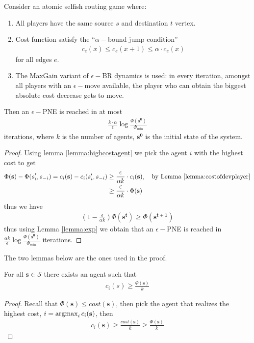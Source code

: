 \begin{thm}
Consider an atomic selfish routing game where:
\begin{enumerate}[1.]
\item All players have the same source $s$ and destination $t$ vertex.
\item Cost function satisfy the ``$\alpha-$bound jump condition''
\begin{align*}
c_e(x)\leq c_e(x+1)\leq\alpha\cdot c_e(x)
\end{align*}
for all edges $e$.
\item The MaxGain variant of $\epsilon-$BR dynamics is used: in every iteration, amongst all players with an $\epsilon-$move available, the player who can obtain the biggest absolute cost decrease gets to move.
\end{enumerate}
 Then an $\epsilon-$PNE is reached in at most
 \begin{align*}
 \frac{k \cdot \alpha}{\epsilon}\log\frac{\Phi(\mathbf{s^0})}{\Phi_{min}}
 \end{align*}
 iterations, where $k$ is the number of agents, $\mathbf{s^0}$ is the initial state of the system.
 \begin{proof}
 Using lemma \ref{lemma:highcostagent} we pick the agent $i$ with the highest cost to get
 \begin{align*}
 \Phi(\mathbf{s})-\Phi(s'_i,s_{-i})= c_i(\mathbf{s})-c_i(s'_i,s_{-i}) &\geq \frac{\epsilon}{\alpha k}\cdot c_i(\mathbf{s}),\quad \text{by Lemma \ref{lemma:costofdevplayer}}\\
 &\geq \frac{\epsilon}{\alpha 	k}\cdot \Phi(\mathbf{s})
 \end{align*}
 thus we have
 \begin{align*}
\left(1-\frac{\epsilon}{\alpha 	k}\right) \Phi(\mathbf{s^t}) \geq \Phi(\mathbf{s^{t+1}}) 
 \end{align*}
 thus using Lemma \ref{lemma:exp} we obtain that an $\epsilon-$PNE is reached in $\frac{\alpha k}{\epsilon}\log \frac{\Phi(\mathbf{s^0})}{\Phi_{min}}$ iterations.
 \end{proof}
\end{thm}

The two lemmas below are the ones used in the proof.

\begin{lemma}
For all $\mathbf{s}\in\mathcal{S}$ there exists an agent such that
\begin{align*}
c_i(s)\geq \frac{\Phi(\mathbf{s})}{k}
\end{align*}
\begin{proof}
Recall that $\Phi(\mathbf{s})\leq cost(\mathbf{s})$, then pick the agent that realizes the highest cost, $i=\operatorname*{argmax}_{i}c_i(\mathbf{s})$, then
\begin{align*}
c_i(\mathbf{s})\geq \frac{cost(\mathbf{s})}{k}\geq \frac{\Phi(\mathbf{s})}{k}
\end{align*}

\end{proof}
\label{lemma:highcostagent}
\end{lemma}

